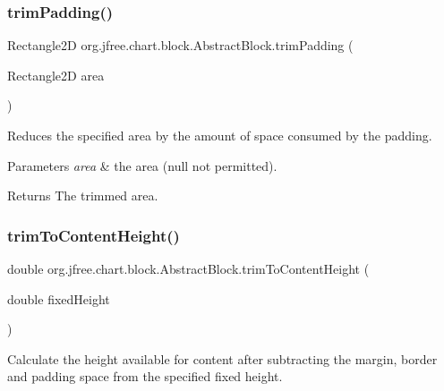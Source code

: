 \subsubsection{\texorpdfstring{trim\+Padding()}{trimPadding()}}
{\footnotesize\ttfamily Rectangle2D org.\+jfree.\+chart.\+block.\+Abstract\+Block.\+trim\+Padding (\begin{DoxyParamCaption}\item[{Rectangle2D}]{area }\end{DoxyParamCaption})\hspace{0.3cm}{\ttfamily [protected]}}

Reduces the specified area by the amount of space consumed by the padding.


\begin{DoxyParams}{Parameters}
{\em area} & the area ({\ttfamily null} not permitted).\\
\hline
\end{DoxyParams}
\begin{DoxyReturn}{Returns}
The trimmed area. 
\end{DoxyReturn}
\mbox{\label{classorg_1_1jfree_1_1chart_1_1block_1_1_abstract_block_ab26a8b24e4b47a2d9d4843d04f83c137}} 
\subsubsection{\texorpdfstring{trim\+To\+Content\+Height()}{trimToContentHeight()}}
{\footnotesize\ttfamily double org.\+jfree.\+chart.\+block.\+Abstract\+Block.\+trim\+To\+Content\+Height (\begin{DoxyParamCaption}\item[{double}]{fixed\+Height }\end{DoxyParamCaption})\hspace{0.3cm}{\ttfamily [protected]}}

Calculate the height available for content after subtracting the margin, border and padding space from the specified fixed height.


